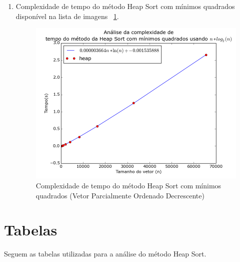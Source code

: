 \documentclass[12pt,a4paper,twoside]{report}
\begin{document}
\begin{enumerate}
\begin{enumerate}
											
											\item Complexidade de tempo do método Heap Sort com mínimos quadrados disponível na lista de imagens  ~\ref{fig:HeapPlot3POD}.
											\begin{figure}[!h]
												\centering
												\includegraphics[scale=0.6]{../imagens/Heap/heap_plot_3_parcialmente_ordenado_decrescente.png}
												\caption{Complexidade de tempo do método Heap Sort com mínimos quadrados (Vetor Parcialmente Ordenado Decrescente) \label{fig:HeapPlot3POD}}
											\end{figure}
										
										\end{enumerate}
			
	
\end{enumerate}

\chapter{Tabelas}

Seguem as tabelas utilizadas para a análise do método Heap Sort.
\end{document}
